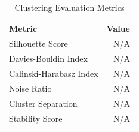 \begin{table}[h]
\centering
\caption{Clustering Evaluation Metrics}
\label{tab:evaluation}
\begin{tabular}{lr}
\hline
Metric & Value \\
\hline
Silhouette Score & N/A \\
Davies-Bouldin Index & N/A \\
Calinski-Harabasz Index & N/A \\
Noise Ratio & N/A \\
Cluster Separation & N/A \\
Stability Score & N/A \\
\hline
\end{tabular}
\end{table}